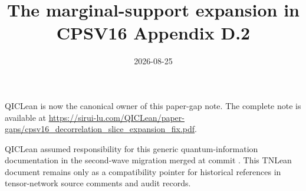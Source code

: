 \documentclass{article}
\title{The marginal-support expansion in CPSV16 Appendix D.2}
\author{}
\date{2026-08-25}
\begin{document}
\maketitle
{}

QICLean is now the canonical owner of this paper-gap note. The complete note
is available at
\url{https://sirui-lu.com/QICLean/paper-gaps/cpsv16_decorrelation_slice_expansion_fix.pdf}.

QICLean assumed responsibility for this generic quantum-information
documentation in the second-wave migration merged at commit
. This TNLean document remains
only as a compatibility pointer for historical references in tensor-network
source comments and audit records.
\end{document}
